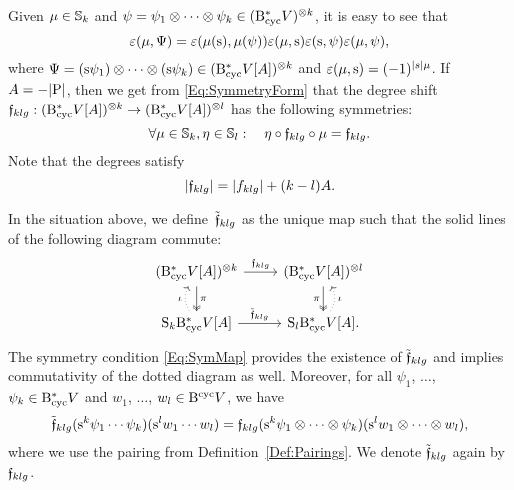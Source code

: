 \documentclass[\MainFolder/Text.tex]{subfiles}
\begin{document}
Given $\mu\in \mathbb{S}_k$ and $\psi = \psi_1 \otimes \dotsb \otimes \psi_k \in (\mathrm{B}_{\mathrm{cyc}}^* V)^{\otimes k}$, it is easy to see that
\[ \varepsilon(\mu, \Psi) = \varepsilon(\mu(\mathrm{s}),\mu(\psi)) \varepsilon(\mu,\mathrm{s})\varepsilon(\mathrm{s},\psi)\varepsilon(\mu,\psi), \]
where $\Psi = (\mathrm{s} \psi_1) \otimes \dotsb \otimes (\mathrm{s} \psi_k) \in (\mathrm{B}_{\mathrm{cyc}}^* V[A])^{\otimes k}$ and $\varepsilon(\mu,\mathrm{s}) = (-1)^{|s|\mu}$. If $A= - |\mathrm{P}|$, then we get from \eqref{Eq:SymmetryForm} that the degree shift $\mathfrak{f}_{klg}: (\mathrm{B}_{\mathrm{cyc}}^* V [A])^{\otimes k} \rightarrow (\mathrm{B}_{\mathrm{cyc}}^* V[A])^{\otimes l}$ has the following symmetries:
\begin{equation}\label{Eq:SymMap}
\forall \mu \in \mathbb{S}_k, \eta\in \mathbb{S}_l: \quad \eta \circ \mathfrak{f}_{klg} \circ \mu = \mathfrak{f}_{klg}.
\end{equation}
Note that the degrees satisfy
\begin{equation}\label{Eq:DegDegShift}
|\mathfrak{f}_{klg}| = |f_{klg}| + (k-l) A.
\end{equation}

\begin{Remark}\label{Rem:SymMaps}
In the situation above, we define~$\tilde{\mathfrak{f}}_{klg}$ as the unique map such that the solid lines of the following diagram commute:    
\[\begin{tikzcd}
(\DBCyc V[A])^{\otimes k} \arrow{r}{\HTP_{klg}} \arrow[two heads]{d}{\pi} & (\DBCyc V[A])^{\otimes l} \arrow[two heads,swap]{d}{\pi}\\
\arrow[bend left,dotted]{u}{\iota}\Sym_k \DBCyc V[A] \arrow{r}{\tilde{\HTP}_{klg}} & \Sym_l \DBCyc V[A].\arrow[bend right,swap,dotted]{u}{\iota}
\end{tikzcd}\]
The symmetry condition \eqref{Eq:SymMap} provides the existence of $\tilde{\mathfrak{f}}_{klg}$ and implies commutativity of the dotted diagram as well. Moreover, for all $\psi_1$, $\dotsc$, $\psi_k \in \mathrm{B}_{\mathrm{cyc}}^* V$ and $w_1$, $\dotsc$, $w_l\in \mathrm{B}^{\mathrm{cyc}} V$, we have 
\[ \tilde{\mathfrak{f}}_{klg}(\mathrm{s}^k \psi_1\cdots \psi_k)(\mathrm{s}^l w_1\cdots w_l) = \mathfrak{f}_{klg}(\mathrm{s}^k \psi_1 \otimes \dotsb \otimes \psi_k)(\mathrm{s}^l w_1 \otimes \dotsb\otimes w_l), \]
where we use the pairing from Definition~\ref{Def:Pairings}. We denote $\tilde{\mathfrak{f}}_{klg}$ again by $\mathfrak{f}_{klg}$.
\end{Remark}
\end{document}
